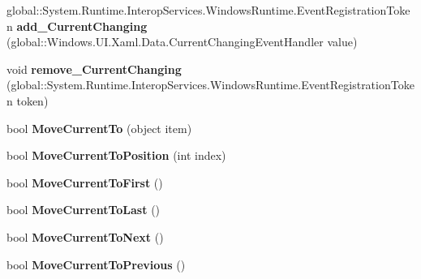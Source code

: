 \begin{DoxyCompactItemize}
global\+::\+System.\+Runtime.\+Interop\+Services.\+Windows\+Runtime.\+Event\+Registration\+Token {\bfseries add\+\_\+\+Current\+Changing} (global\+::\+Windows.\+U\+I.\+Xaml.\+Data.\+Current\+Changing\+Event\+Handler value)
\item 
\mbox{\label{interface_windows_1_1_u_i_1_1_xaml_1_1_data_1_1_i_collection_view_aaeb8082e843bdfe31cc2c2cde59291c9}} 
void {\bfseries remove\+\_\+\+Current\+Changing} (global\+::\+System.\+Runtime.\+Interop\+Services.\+Windows\+Runtime.\+Event\+Registration\+Token token)
\item 
\mbox{\label{interface_windows_1_1_u_i_1_1_xaml_1_1_data_1_1_i_collection_view_aa3e3071eca08209ea25a6a0bb1f3171c}} 
bool {\bfseries Move\+Current\+To} (object item)
\item 
\mbox{\label{interface_windows_1_1_u_i_1_1_xaml_1_1_data_1_1_i_collection_view_ae88f3d07181d3a6e208afb6bda974829}} 
bool {\bfseries Move\+Current\+To\+Position} (int index)
\item 
\mbox{\label{interface_windows_1_1_u_i_1_1_xaml_1_1_data_1_1_i_collection_view_ad33f946fe8c227113abf86382ef89863}} 
bool {\bfseries Move\+Current\+To\+First} ()
\item 
\mbox{\label{interface_windows_1_1_u_i_1_1_xaml_1_1_data_1_1_i_collection_view_ae65c293d74c8ea11c12e336ac356a09b}} 
bool {\bfseries Move\+Current\+To\+Last} ()
\item 
\mbox{\label{interface_windows_1_1_u_i_1_1_xaml_1_1_data_1_1_i_collection_view_a610b679e23844c41db0d4efbc636d544}} 
bool {\bfseries Move\+Current\+To\+Next} ()
\item 
\mbox{\label{interface_windows_1_1_u_i_1_1_xaml_1_1_data_1_1_i_collection_view_a2760c561a55591665e6f3b806911c9f5}} 
bool {\bfseries Move\+Current\+To\+Previous} ()
\item 

\end{DoxyCompactItemize}
